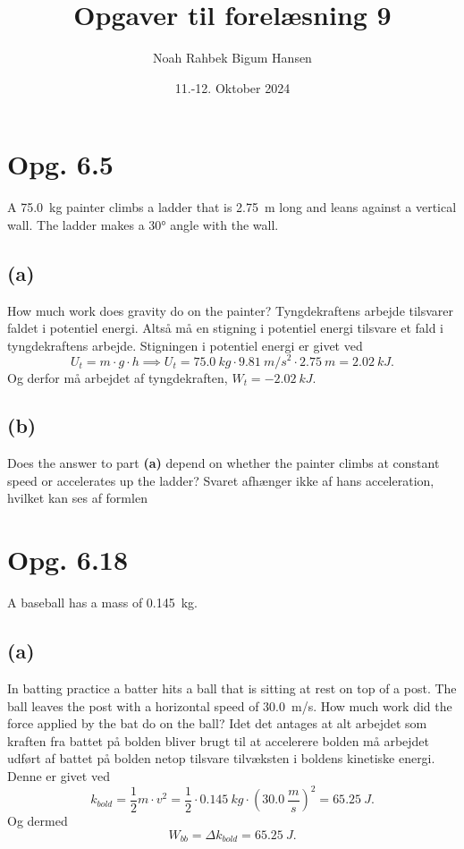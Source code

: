 \documentclass[12pt]{article}
\title{Opgaver til forelæsning 9}
\author{Noah Rahbek Bigum Hansen}
\date{11.-12. Oktober 2024}
\begin{document}
\maketitle

\section*{Opg. 6.5}
A \qty{75,0}{kg} painter climbs a ladder that is \qty{2,75}{m} long and leans against a vertical wall. The ladder makes a \ang{30} angle with the wall.


\subsection*{(a)}
How much work does gravity do on the painter?
\bigbreak
Tyngdekraftens arbejde tilsvarer faldet i potentiel energi. Altså må en stigning i potentiel energi tilsvare et fald i tyngdekraftens arbejde. Stigningen i potentiel energi er givet ved
\[
U_t = m \cdot g\cdot h \implies U_t = \qty{75,0}{kg} \cdot \qty{9,81}{m/s^2} \cdot \qty{2,75}{m} = \qty{2,02}{kJ}
.\] 
Og derfor må arbejdet af tyngdekraften, $W_t = \qty{-2,02}{kJ}$. 


\subsection*{(b)}
Does the answer to part \textbf{(a)} depend on whether the painter climbs at constant speed or accelerates up the ladder?
\bigbreak
Svaret afhænger ikke af hans acceleration, hvilket kan ses af formlen



\section*{Opg. 6.18}
A baseball has a mass of \qty{0,145}{kg}.


\subsection*{(a)}
In batting practice a batter hits a ball that is sitting at rest on top of a post. The ball leaves the post with a horizontal speed of \qty{30,0}{m/s}. How much work did the force applied by the bat do on the ball?
\bigbreak
Idet det antages at alt arbejdet som kraften fra battet på bolden bliver brugt til at accelerere bolden må arbejdet udført af battet på bolden netop tilsvare tilvæksten i boldens kinetiske energi. Denne er givet ved
\[
k_{bold} = \frac{1}{2}m\cdot v^2 = \frac{1}{2} \cdot \qty{0,145}{kg} \cdot \left( \qty{30,0}{\frac{m}{s}} \right)^2 = \qty{65,25}{J}
.\] 
Og dermed
\[
W_{bb} = \Delta k_{bold} = \qty{65,25}{J}
.\] 
\end{document}
